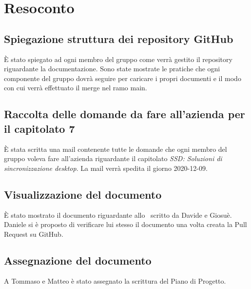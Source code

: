 \newpage


\section{Resoconto}

\subsection{Spiegazione struttura dei repository GitHub}

È stato spiegato ad ogni membro del gruppo come verrà gestito il repository riguardante la documentazione. Sono state mostrate le pratiche che ogni componente del gruppo dovrà seguire per caricare i propri documenti e il modo con cui verrà effettuato il merge nel ramo main.

\subsection{Raccolta delle domande da fare all'azienda per il capitolato 7}

È stata scritta una mail contenente tutte le domande che ogni membro del gruppo voleva fare all'azienda riguardante il capitolato \textit{SSD: Soluzioni di sincronizzazione desktop}.
La mail verrà spedita il giorno 2020-12-09.

\subsection{Visualizzazione del documento \SdF{}}

È stato mostrato il documento riguardante allo \SdF\ scritto da Davide e Giosuè. Daniele si è proposto di verificare lui stesso il documento una volta creata la Pull Request su GitHub.

\subsection{Assegnazione del documento \PdP{}}

A Tommaso e Matteo è stato assegnato la scrittura del Piano di Progetto.

\newpage

